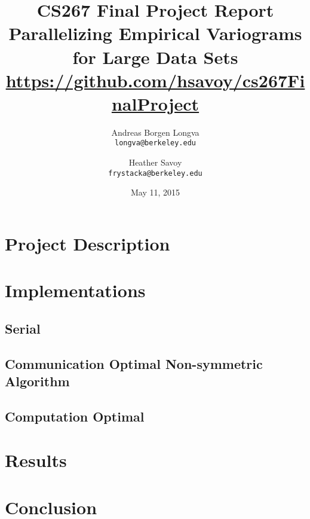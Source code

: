 \documentclass[11pt, oneside,titlepage]{article}   	%
\title{CS267 Final Project Report\\
  \large Parallelizing Empirical Variograms for Large Data Sets\\
  \url{https://github.com/hsavoy/cs267FinalProject}}
\author{Andreas Borgen Longva\\
  \texttt{longva@berkeley.edu}
  \and
  Heather Savoy\\
  \texttt{frystacka@berkeley.edu}}
\date{May 11, 2015}							%
\begin{document}
\maketitle
\section{Project Description}


\section{Implementations}
  \subsection{Serial}
    
  \subsection{Communication Optimal Non-symmetric Algorithm}
    
  \subsection{Computation Optimal}
   
   
\section{Results}
  

\section{Conclusion}
   



\end{document}
